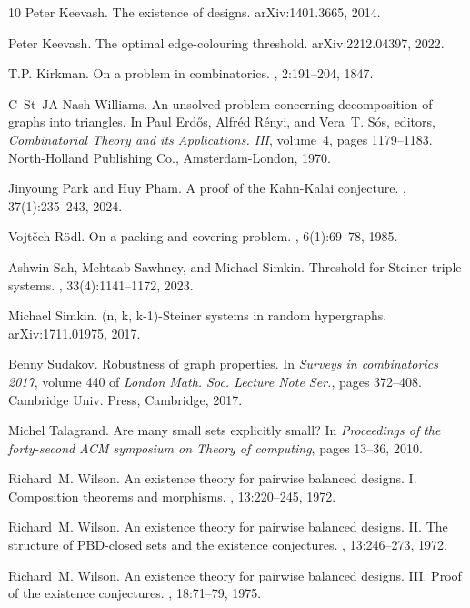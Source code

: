 \documentclass[11pt]{article}
\numberwithin{equation}{section}
\newcounter{i}
\theoremstyle{plain}
\theoremstyle{plain} %
\theoremstyle{definition}
\begin{document}
\begin{thebibliography}{10}
Peter Keevash.
\newblock The existence of designs.
\newblock arXiv:1401.3665, 2014.

Peter Keevash.
\newblock The optimal edge-colouring threshold.
\newblock arXiv:2212.04397, 2022.

T.P. Kirkman.
\newblock On a problem in combinatorics.
, 2:191--204, 1847.

C~St~JA Nash-Williams.
\newblock An unsolved problem concerning decomposition of graphs into
  triangles.
\newblock In Paul Erd\H{o}s, Alfr\'{e}d R\'{e}nyi, and Vera~T. S\'{o}s,
  editors, {\em Combinatorial Theory and its Applications. {III}}, volume~4,
  pages 1179--1183. North-Holland Publishing Co., Amsterdam-London, 1970.

Jinyoung Park and Huy Pham.
\newblock A proof of the {K}ahn-{K}alai conjecture.
, 37(1):235--243, 2024.

Vojt\v{e}ch R\"{o}dl.
\newblock On a packing and covering problem.
, 6(1):69--78, 1985.

Ashwin Sah, Mehtaab Sawhney, and Michael Simkin.
\newblock Threshold for {S}teiner triple systems.
, 33(4):1141--1172, 2023.

Michael Simkin.
\newblock (n, k, k-1)-{S}teiner systems in random hypergraphs.
\newblock arXiv:1711.01975, 2017.

Benny Sudakov.
\newblock Robustness of graph properties.
\newblock In {\em Surveys in combinatorics 2017}, volume 440 of {\em London
  Math. Soc. Lecture Note Ser.}, pages 372--408. Cambridge Univ. Press,
  Cambridge, 2017.

Michel Talagrand.
\newblock Are many small sets explicitly small?
\newblock In {\em Proceedings of the forty-second ACM symposium on Theory of
  computing}, pages 13--36, 2010.

Richard~M. Wilson.
\newblock An existence theory for pairwise balanced designs. {I}. {C}omposition
  theorems and morphisms.
, 13:220--245, 1972.

Richard~M. Wilson.
\newblock An existence theory for pairwise balanced designs. {II}. {T}he
  structure of {PBD}-closed sets and the existence conjectures.
, 13:246--273, 1972.

Richard~M. Wilson.
\newblock An existence theory for pairwise balanced designs. {III}. {P}roof of
  the existence conjectures.
, 18:71--79, 1975.

\end{thebibliography}
\end{document}
